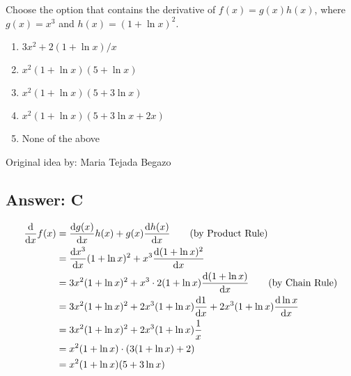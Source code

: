 
Choose the option that contains the derivative of $f(x) = g(x) h(x)$, where $g(x) = x^3$ and $h(x) = (1 + \ln x)^2$.

\begin{enumerate}[label={\Alph*.}]
    \item $3x^2 + 2 (1 + \ln x)/x$
    \item $x^2 (1 + \ln x) (5 + \ln x)$
    \item $x^2 (1 + \ln x) (5 + 3 \ln x)$
    \item $x^2 (1 + \ln x) (5 + 3 \ln x + 2x)$
    \item None of the above
\end{enumerate}

Original idea by: Maria Tejada Begazo


\subsection*{Answer: C}

\begin{align*}
    \dv{x} f(x) &= \dv{g(x)}{x} h(x) + g(x) \dv{h(x)}{x}
            \tag*{(by Product Rule)} \\
        &= {\dv{x^3}{x}} (1 + \ln x)^2 + x^3 \dv{(1 + \ln x)^2}{x} \\
        &= 3 x^2 (1 + \ln x)^2 + x^3 \cdot 2 (1 + \ln x) \dv{(1 + \ln x)}{x}
            \tag*{(by Chain Rule)} \\
        &= 3 x^2 (1 + \ln x)^2 + 2 x^3 (1 + \ln x) \dv{1}{x} + 2 x^3 (1 + \ln x) \dv{\ln x}{x} \\
        &= 3 x^2 (1 + \ln x)^2 + 2 x^3 (1 + \ln x) \frac{1}{x} \\
        &= x^2 (1 + \ln x) \cdot (3 (1 + \ln x) + 2) \\
        &= x^2 (1 + \ln x) (5 + 3 \ln x)
\end{align*}
